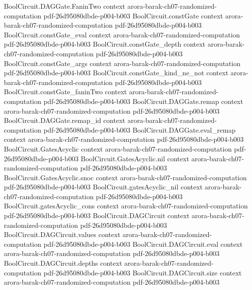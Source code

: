\begin{theorem}
\proofstep
  {BoolCircuit.DAGGate.FaninTwo}
  {context}
  {arora-barak-ch07-randomized-computation}
  {pdf-26d95080dbde-p004-b003}
\proofstep
  {BoolCircuit.constGate}
  {context}
  {arora-barak-ch07-randomized-computation}
  {pdf-26d95080dbde-p004-b003}
\proofstep
  {BoolCircuit.constGate_eval}
  {context}
  {arora-barak-ch07-randomized-computation}
  {pdf-26d95080dbde-p004-b003}
\proofstep
  {BoolCircuit.constGate_depth}
  {context}
  {arora-barak-ch07-randomized-computation}
  {pdf-26d95080dbde-p004-b003}
\proofstep
  {BoolCircuit.constGate_args}
  {context}
  {arora-barak-ch07-randomized-computation}
  {pdf-26d95080dbde-p004-b003}
\proofstep
  {BoolCircuit.constGate_kind_ne_not}
  {context}
  {arora-barak-ch07-randomized-computation}
  {pdf-26d95080dbde-p004-b003}
\proofstep
  {BoolCircuit.constGate_faninTwo}
  {context}
  {arora-barak-ch07-randomized-computation}
  {pdf-26d95080dbde-p004-b003}
\proofstep
  {BoolCircuit.DAGGate.remap}
  {context}
  {arora-barak-ch07-randomized-computation}
  {pdf-26d95080dbde-p004-b003}
\proofstep
  {BoolCircuit.DAGGate.remap_id}
  {context}
  {arora-barak-ch07-randomized-computation}
  {pdf-26d95080dbde-p004-b003}
\proofstep
  {BoolCircuit.DAGGate.eval_remap}
  {context}
  {arora-barak-ch07-randomized-computation}
  {pdf-26d95080dbde-p004-b003}
\proofstep
  {BoolCircuit.GatesAcyclic}
  {context}
  {arora-barak-ch07-randomized-computation}
  {pdf-26d95080dbde-p004-b003}
\proofstep
  {BoolCircuit.GatesAcyclic.nil}
  {context}
  {arora-barak-ch07-randomized-computation}
  {pdf-26d95080dbde-p004-b003}
\proofstep
  {BoolCircuit.GatesAcyclic.snoc}
  {context}
  {arora-barak-ch07-randomized-computation}
  {pdf-26d95080dbde-p004-b003}
\proofstep
  {BoolCircuit.gatesAcyclic_nil}
  {context}
  {arora-barak-ch07-randomized-computation}
  {pdf-26d95080dbde-p004-b003}
\proofstep
  {BoolCircuit.gatesAcyclic_cons}
  {context}
  {arora-barak-ch07-randomized-computation}
  {pdf-26d95080dbde-p004-b003}
\proofstep
  {BoolCircuit.DAGCircuit}
  {context}
  {arora-barak-ch07-randomized-computation}
  {pdf-26d95080dbde-p004-b003}
\proofstep
  {BoolCircuit.DAGCircuit.values}
  {context}
  {arora-barak-ch07-randomized-computation}
  {pdf-26d95080dbde-p004-b003}
\proofstep
  {BoolCircuit.DAGCircuit.eval}
  {context}
  {arora-barak-ch07-randomized-computation}
  {pdf-26d95080dbde-p004-b003}
\proofstep
  {BoolCircuit.DAGCircuit.depths}
  {context}
  {arora-barak-ch07-randomized-computation}
  {pdf-26d95080dbde-p004-b003}
\proofstep
  {BoolCircuit.DAGCircuit.size}
  {context}
  {arora-barak-ch07-randomized-computation}
  {pdf-26d95080dbde-p004-b003}

\end{theorem}
